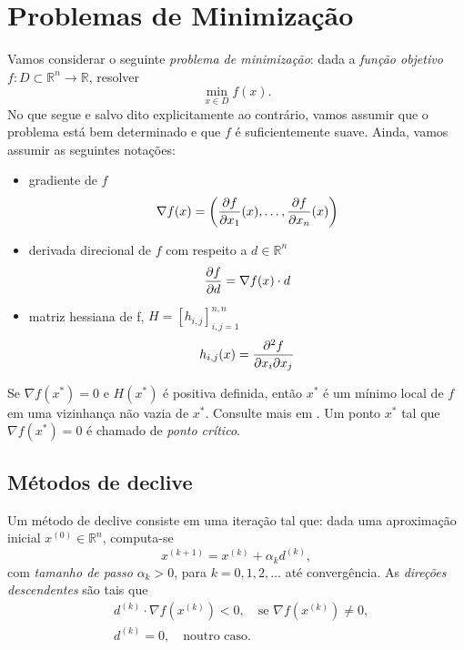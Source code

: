 \section{Problemas de Minimização}\label{cap_otimizacao_sec_minimi}

Vamos considerar o seguinte \emph{problema de minimização}: dada a \emph{função objetivo} $f:D\subset \mathbb{R}^n\to\mathbb{R}$, resolver
\begin{equation}
  \min_{x\in D} f(x).
\end{equation}
No que segue e salvo dito explicitamente ao contrário, vamos assumir que o problema está bem determinado e que $f$ é suficientemente suave. Ainda, vamos assumir as seguintes notações:
\begin{itemize}
\item gradiente de $f$
  \begin{equation}
    \nabla f(x) = \left(\frac{\partial f}{\partial x_1}(x),\dotsc,\frac{\partial f}{\partial x_n}(x)\right)
  \end{equation}
\item derivada direcional de $f$ com respeito a $d\in\mathbb{R}^n$
  \begin{equation}
    \frac{\partial f}{\partial d} = \nabla f(x)\cdot d
  \end{equation}
\item matriz hessiana de f, $H=[h_{i,j}]_{i,j=1}^{n,n}$
  \begin{equation}
    h_{i,j}(x) = \frac{\partial^2 f}{\partial x_i\partial x_j}
  \end{equation}
\end{itemize}

\begin{obs}
  Se $\nabla f(x^*) = 0$ e $H(x^*)$ é positiva definida, então $x^*$ é um mínimo local de $f$ em uma vizinhança não vazia de $x^*$. Consulte mais em \cite[Seção 7.2]{Quarteroni2007}. Um ponto $x^*$ tal que $\nabla f(x^*) = 0$ é chamado de \emph{ponto crítico}.
\end{obs}

\subsection{Métodos de declive}

Um método de declive consiste em uma iteração tal que: dada uma aproximação inicial $x^{(0)}\in\mathbb{R}^n$, computa-se
\begin{equation}
  x^{(k+1)} = x^{(k)} + \alpha_k d^{(k)},
\end{equation}
com \emph{tamanho de passo} $\alpha_k>0$, para $k=0,1,2,\ldots$ até convergência. As \emph{direções descendentes} são tais que
\begin{align}
  &d^{(k)}\cdot\nabla f(x^{(k)}) < 0,\quad \text{se } \nabla f(x^{(k)}) \neq 0,\label{eq:condDirecoes0}\\
  &d^{(k)} = 0,\quad \text{noutro caso.}\label{eq:condDirecoes1}
\end{align}

